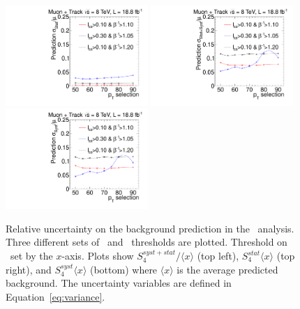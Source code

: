 \begin{figure}
\begin{center}
\includegraphics[clip=false, trim=0.0cm 0cm 0.0cm 0cm, width=0.48\textwidth]{figures/tkmu/Systematics_Data8TeV_pT_Stat}
\includegraphics[clip=false, trim=0.0cm 0cm 0.0cm 0cm, width=0.48\textwidth]{figures/tkmu/Systematics_Data8TeV_pT_Sum} \\
\includegraphics[clip=false, trim=0.0cm 0cm 0.0cm 0cm, width=0.48\textwidth]{figures/tkmu/Systematics_Data8TeV_pT_Syst}
\caption[Statistical and systematic uncertainty in the background prediction for different sets of thresholds in the \tktof\ analysis.]
{
Relative uncertainty on the background prediction in the \tktof\ analysis.
Three different sets of \invbeta\ and \dedx\ thresholds are plotted. Threshold on \pt\ set by the $x$-axis.
Plots show $S^{syst+stat}_{4}/\langle x \rangle$ (top left), $S^{stat}_{4}\langle x \rangle$ (top right), and $S^{syst}_{4}\langle x \rangle$ (bottom)
where $\langle x \rangle$ is the average predicted background.
The uncertainty variables are defined in Equation~\ref{eq:variance}.
}
\label{fig:TkMuUnc}
\end{center}
\end{figure}

